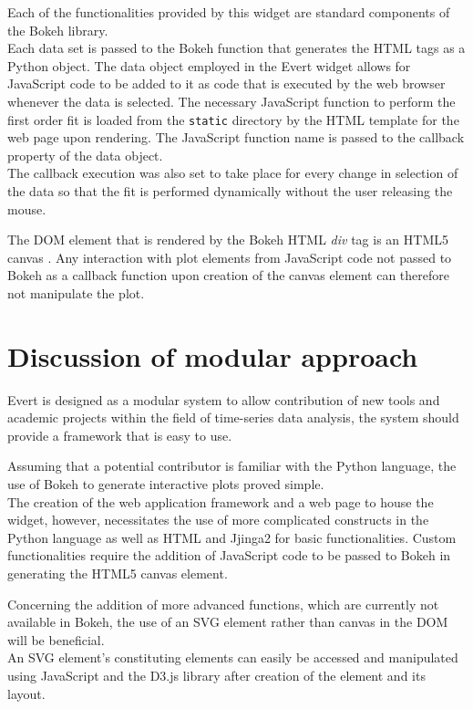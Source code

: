\documentclass[a4paper,12pt]{article}
\begin{document}
Each of the functionalities provided by this widget are standard components of the Bokeh library.\\Each data set is passed to the Bokeh function that generates the HTML tags as a Python object. The data object employed in the Evert widget allows for JavaScript code to be added to it as code that is executed by the web browser whenever the data is selected. The necessary JavaScript function to perform the first order fit is loaded from the \texttt{static} directory by the HTML template for the web page upon rendering. The JavaScript function name is passed to the callback property of the data object.\\The callback execution was also set to take place for every change in selection of the data so that the fit is performed dynamically without the user releasing the mouse.

The DOM element that is rendered by the Bokeh HTML \emph{div} tag is an HTML5 canvas \citep{bokeh}. Any interaction with plot elements from JavaScript code not passed to Bokeh as a callback function upon creation of the canvas element can therefore not manipulate the plot.

\section{Discussion of modular approach}
Evert is designed as a modular system to allow contribution of new tools and academic projects within the field of time-series data analysis, the system should provide a framework that is easy to use.

Assuming that a potential contributor is familiar with the Python language, the use of Bokeh to generate interactive plots proved simple.\\The creation of the web application framework and a web page to house the widget, however, necessitates the use of more complicated constructs in the Python language as well as HTML and Jjinga2 for basic functionalities. Custom functionalities require the addition of JavaScript code to be passed to Bokeh in generating the HTML5 canvas element.

Concerning the addition of more advanced functions, which are currently not available in Bokeh, the use of an SVG element rather than canvas in the DOM will be beneficial.\\An SVG element's constituting elements can easily be accessed and manipulated using JavaScript and the D3.js library after creation of the element and its layout.
\end{document}
